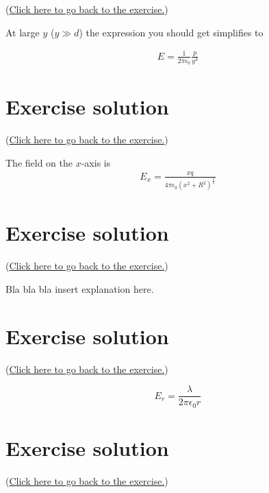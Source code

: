 \documentclass[
]{book}
\begin{document}
(\protect\hyperlink{dipoleEx}{Click here to go back to the exercise.})

At large \(y\) (\(y \gg d\)) the expression you should get simplifies to

\[\begin{aligned}
E = \frac{1}{2 \pi \epsilon_0} \frac{p}{y^3}
\end{aligned}\]

\hypertarget{ringExSol}{%
\section*{Exercise solution}\label{ringExSol}}

(\protect\hyperlink{ringEx}{Click here to go back to the exercise.})

The field on the \(x\)-axis is \[\begin{aligned}
E_x = \frac{xq}{4 \pi\epsilon_0 (x^2 + R^2)^{\frac{3}{2}}}
\end{aligned}\]

\hypertarget{ringEx2Sol}{%
\section*{Exercise solution}\label{ringEx2Sol}}

(\protect\hyperlink{ringEx2}{Click here to go back to the exercise.})

Bla bla bla insert explanation here.

\hypertarget{GaussLineExSol}{%
\section*{Exercise solution}\label{GaussLineExSol}}

(\protect\hyperlink{GaussLineEx}{Click here to go back to the exercise.})

\[\label{eq:GLSol}
E_r = \frac{\lambda}{2\pi\epsilon_0 r}\]

\hypertarget{cyclotronExSol}{%
\section*{Exercise solution}\label{cyclotronExSol}}

(\protect\hyperlink{cyclotronEx}{Click here to go back to the exercise.})
\end{document}
